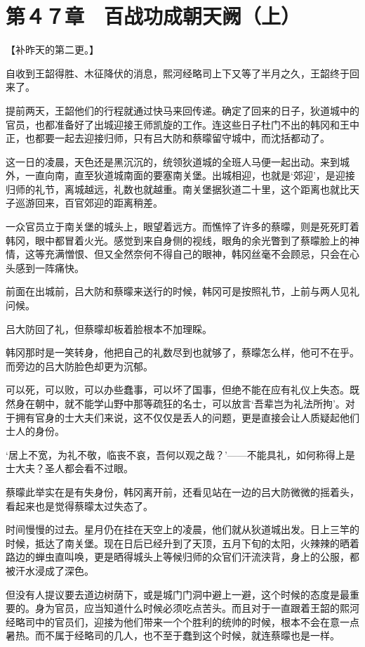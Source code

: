 \section{第４７章　百战功成朝天阙（上）}

【补昨天的第二更。】

自收到王韶得胜、木征降伏的消息，熙河经略司上下又等了半月之久，王韶终于回来了。

提前两天，王韶他们的行程就通过快马来回传递。确定了回来的日子，狄道城中的官员，也都准备好了出城迎接王师凯旋的工作。连这些日子杜门不出的韩冈和王中正，也都要一起去迎接归师，只有吕大防和蔡曚留守城中，而沈括都动了。

这一日的凌晨，天色还是黑沉沉的，统领狄道城的全班人马便一起出动。来到城外，一直向南，直至狄道城南面的要塞南关堡。出城相迎，也就是‘郊迎’，是迎接归师的礼节，离城越远，礼数也就越重。南关堡据狄道二十里，这个距离也就比天子巡游回来，百官郊迎的距离稍差。

一众官员立于南关堡的城头上，眼望着远方。而憔悴了许多的蔡曚，则是死死盯着韩冈，眼中都冒着火光。感觉到来自身侧的视线，眼角的余光瞥到了蔡曚脸上的神情，这等充满憎恨、但又全然奈何不得自己的眼神，韩冈丝毫不会顾忌，只会在心头感到一阵痛快。

前面在出城前，吕大防和蔡曚来送行的时候，韩冈可是按照礼节，上前与两人见礼问候。

吕大防回了礼，但蔡曚却板着脸根本不加理睬。

韩冈那时是一笑转身，他把自己的礼数尽到也就够了，蔡曚怎么样，他可不在乎。而旁边的吕大防脸色却更为沉郁。

可以死，可以败，可以办些蠢事，可以坏了国事，但绝不能在应有礼仪上失态。既然身在朝中，就不能学山野中那等疏狂的名士，可以放言‘吾辈岂为礼法所拘’。对于拥有官身的士大夫们来说，这不仅仅是丢人的问题，更是直接会让人质疑起他们士人的身份。

‘居上不宽，为礼不敬，临丧不哀，吾何以观之哉？’——不能具礼，如何称得上是士大夫？圣人都会看不过眼。

蔡曚此举实在是有失身份，韩冈离开前，还看见站在一边的吕大防微微的摇着头，看起来也是觉得蔡曚太过失态了。

时间慢慢的过去。星月仍在挂在天空上的凌晨，他们就从狄道城出发。日上三竿的时候，抵达了南关堡。现在日后已经升到了天顶，五月下旬的太阳，火辣辣的晒着路边的蝉虫直叫唤，更是晒得城头上等候归师的众官们汗流浃背，身上的公服，都被汗水浸成了深色。

但没有人提议要去道边树荫下，或是城门门洞中避上一避，这个时候的态度是最重要的。身为官员，应当知道什么时候必须吃点苦头。而且对于一直跟着王韶的熙河经略司中的官员们，迎接为他们带来一个个胜利的统帅的时候，根本不会在意一点暑热。而不属于经略司的几人，也不至于蠢到这个时候，就连蔡曚也是一样。

